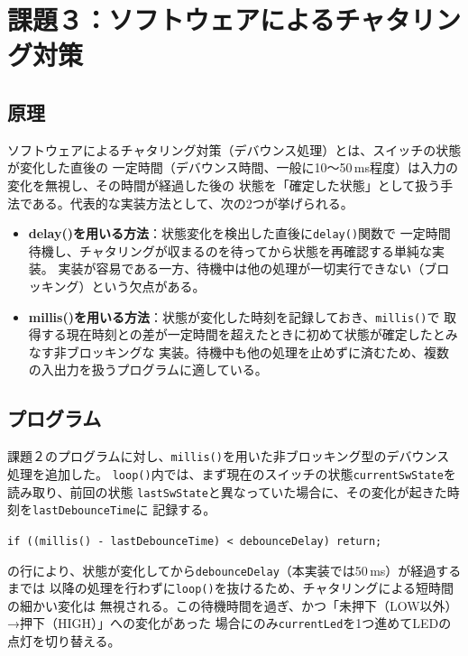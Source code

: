 \documentclass[12pt,a4paper]{ltjsarticle}
\begin{document}
\section{課題３：ソフトウェアによるチャタリング対策}\label{sec:task3}


\subsection{原理}\label{sec:task3-theory}
ソフトウェアによるチャタリング対策（デバウンス処理）とは、スイッチの状態が変化した直後の
一定時間（デバウンス時間、一般に10〜50\,ms程度）は入力の変化を無視し、その時間が経過した後の
状態を「確定した状態」として扱う手法である。代表的な実装方法として、次の2つが挙げられる。
\begin{itemize}
  \item \textbf{delay()を用いる方法}：状態変化を検出した直後に\texttt{delay()}関数で
        一定時間待機し、チャタリングが収まるのを待ってから状態を再確認する単純な実装。
        実装が容易である一方、待機中は他の処理が一切実行できない（ブロッキング）という欠点がある。
  \item \textbf{millis()を用いる方法}：状態が変化した時刻を記録しておき、\texttt{millis()}で
        取得する現在時刻との差が一定時間を超えたときに初めて状態が確定したとみなす非ブロッキングな
        実装。待機中も他の処理を止めずに済むため、複数の入出力を扱うプログラムに適している。
\end{itemize}

\subsection{プログラム}\label{sec:task3-program}



課題２のプログラムに対し、\texttt{millis()}を用いた非ブロッキング型のデバウンス処理を追加した。
\texttt{loop()}内では、まず現在のスイッチの状態\texttt{currentSwState}を読み取り、前回の状態
\texttt{lastSwState}と異なっていた場合に、その変化が起きた時刻を\texttt{lastDebounceTime}に
記録する。
\begin{center}
\texttt{if ((millis() - lastDebounceTime) < debounceDelay) return;}
\end{center}
の行により、状態が変化してから\texttt{debounceDelay}（本実装では50\,ms）が経過するまでは
以降の処理を行わずに\texttt{loop()}を抜けるため、チャタリングによる短時間の細かい変化は
無視される。この待機時間を過ぎ、かつ「未押下（LOW以外）→押下（HIGH）」への変化があった
場合にのみ\texttt{currentLed}を1つ進めてLEDの点灯を切り替える。
\end{document}
